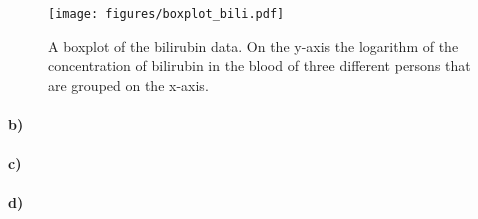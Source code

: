 \begin{figure}
    \centering
    \texttt{[image: figures/boxplot\_bili.pdf]}
    \caption{A boxplot of the bilirubin data. On the y-axis the logarithm of the concentration of bilirubin in the blood of three different persons that are grouped on the x-axis.}
    \label{fig:boxplot_bili}
\end{figure}

\paragraph{b)}


\paragraph{c)}


\paragraph{d)}

